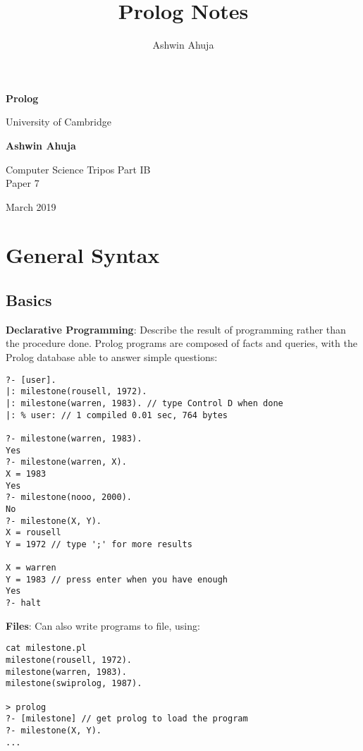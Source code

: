 \documentclass{article}
\title{Prolog Notes}
\author{Ashwin Ahuja}
\begin{document}
\begin{titlepage}
\begin{center}
			\vspace*{1cm}
			
			\Huge
			\textbf{Prolog}
			
			\vspace{0.5cm}
			\LARGE
			University of Cambridge
			
			\vspace{1.5cm}
			
			\textbf{Ashwin Ahuja}
			
			\vfill
			
			Computer Science Tripos Part IB\\
			Paper 7
			
			\vspace{5cm}
			
			
			March 2019
			
\end{center}
\end{titlepage}

\tableofcontents
\pagebreak
\section{General Syntax}
\subsection{Basics}
\textbf{Declarative Programming}: Describe the result of programming rather than the procedure done. Prolog programs are composed of facts and queries, with the Prolog database able to answer simple questions:
	
\begin{lstlisting}[frame=single]
?- [user].
|: milestone(rousell, 1972).
|: milestone(warren, 1983). // type Control D when done
|: % user: // 1 compiled 0.01 sec, 764 bytes
			
?- milestone(warren, 1983).
Yes
?- milestone(warren, X).
X = 1983
Yes
?- milestone(nooo, 2000).
No
?- milestone(X, Y).
X = rousell
Y = 1972 // type ';' for more results

X = warren
Y = 1983 // press enter when you have enough
Yes
?- halt
\end{lstlisting}

\noindent
\textbf{Files}: Can also write programs to file, using:

\begin{lstlisting}[frame=single]
cat milestone.pl
milestone(rousell, 1972).
milestone(warren, 1983).
milestone(swiprolog, 1987).

> prolog
?- [milestone] // get prolog to load the program
?- milestone(X, Y).
...
\end{lstlisting}
\end{document}
